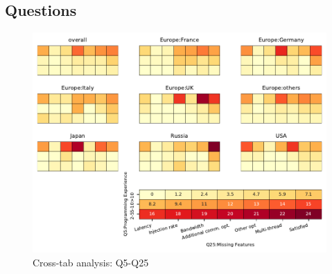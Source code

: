 
\subsection{Questions}


\begin{figure}
\begin{center}
\includegraphics[width=12cm]{../pdfs/Q5-Q25.pdf}
\caption{Cross-tab analysis: Q5-Q25}
\label{fig:Q5-Q25}
\end{center}
\end{figure}
